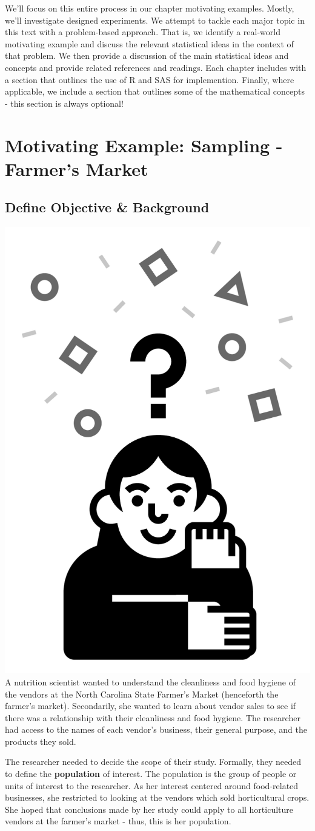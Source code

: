 \documentclass[
]{book}
\theoremstyle{definition}
\theoremstyle{definition}
\theoremstyle{definition}
\theoremstyle{remark}
\begin{document}
We'll focus on this entire process in our chapter motivating examples. Mostly, we'll investigate designed experiments. We attempt to tackle each major topic in this text with a problem-based approach. That is, we identify a real-world motivating example and discuss the relevant statistical ideas in the context of that problem. We then provide a discussion of the main statistical ideas and concepts and provide related references and readings. Each chapter includes with a section that outlines the use of R and SAS for implemention. Finally, where applicable, we include a section that outlines some of the mathematical concepts - this section is always optional!

\hypertarget{motivating-example-sampling---farmers-market}{%
\section{Motivating Example: Sampling - Farmer's Market}\label{motivating-example-sampling---farmers-market}}

\hypertarget{define-objective-background}{%
\subsection{Define Objective \& Background}\label{define-objective-background}}

\includegraphics[width=0.13\linewidth,style="float:left; padding:10px"]{img/defineObjective}
A nutrition scientist wanted to understand the cleanliness and food hygiene of the vendors at the North Carolina State Farmer's Market (henceforth the farmer's market). Secondarily, she wanted to learn about vendor sales to see if there was a relationship with their cleanliness and food hygiene. The researcher had access to the names of each vendor's business, their general purpose, and the products they sold.

The researcher needed to decide the scope of their study. Formally, they needed to define the \textbf{population} of interest. The population is the group of people or units of interest to the researcher. As her interest centered around food-related businesses, she restricted to looking at the vendors which sold horticultural crops. She hoped that conclusions made by her study could apply to all horticulture vendors at the farmer's market - thus, this is her population.
\end{document}
